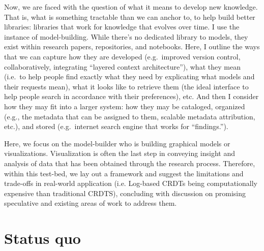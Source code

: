 \documentclass[
]{article}
\begin{document}
Now, we are faced with the question of what it means to develop new
knowledge. That is, what is something tractable than we can anchor to,
to help build better libraries: libraries that work for knowledge that
evolves over time. I use the instance of model-building. While there's
no dedicated library to models, they exist within research papers,
repositories, and notebooks. Here, I outline the ways that we can
capture how they are developed (e.g.~improved version control,
collaboratively, integrating ``layered context architecture''), what
they mean (i.e.~to help people find exactly what they need by
explicating what models and their requests mean), what it looks like to
retrieve them (the ideal interface to help people search in accordance
with their preferences), etc. And then I consider how they may fit into
a larger system: how they may be cataloged, organized (e.g., the
metadata that can be assigned to them, scalable metadata attribution,
etc.), and stored (e.g.~internet search engine that works for
``findings.'').

Here, we focus on the model-builder who is building graphical models or
visualizations. Visualization is often the last step in conveying
insight and analysis of data that has been obtained through the research
process. Therefore, within this test-bed, we lay out a framework and
suggest the limitations and trade-offs in real-world application (i.e.
Log-based CRDTs being computationally expensive than traditional CRDTS),
concluding with discussion on promising speculative and existing areas
of work to address them.

\section{Status quo}\label{status-quo}
\end{document}
